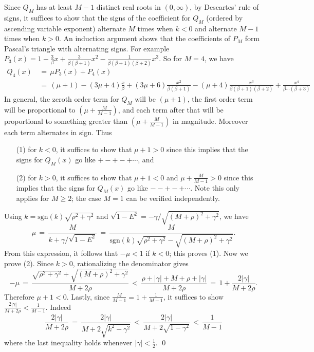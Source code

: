 \documentclass[11 pt]{article}
\renewcommand\({\left(}
\renewcommand\){\right)}
\newcommand\<{\langle}
\renewcommand\>{\rangle}
\newcommand\g{\gamma}
\newcommand\8{\infty}
\newcommand{\half}{\frac{1}{2}}
\newcommand{\sgn}{\mbox{sgn}}
\begin{document}
Since $Q_M$ has at least $M - 1$ distinct real roots in $(0, \infty)$, by Descartes' rule of signs, it suffices to show that the signs of the coefficient for $Q_M$ (ordered by ascending variable exponent) alternate $M$ times when $k < 0$ and alternate $M - 1$ times when $k > 0$. An induction argument shows that the coefficients of $P_M$ form Pascal's triangle with alternating signs. For example $P_3(x) = 1 - \frac{3}{\beta} x + \frac{3}{\beta(\beta + 1)}x^2 - \frac{1}{\beta(\beta + 1)(\beta + 2)}x^3$. So for $M = 4$, we have
\begin{align*}
Q_4(x) \,&=\, \mu P_3(x) + P_4(x)
\\
&=\,  (\mu + 1) -(3\mu + 4) \frac{x}{\beta} + (3\mu + 6)\frac{x^2}{\beta(\beta + 1)} - (\mu + 4)\frac{x^3}{\beta(\beta + 1)(\beta + 2)} + \frac{x^4}{\beta \dotsb (\beta + 3)}
\end{align*} 
In general, the zeroth order term for $Q_M$ will be $(\mu + 1)$, the first order term will be proportional to $(\mu + \frac{M}{M-1})$, and each term after that will be proportional to something greater than $(\mu + \frac{M}{M-1})$ in magnitude. Moreover each term alternates in sign. Thus
\begin{itemize}
\item[(1)]for $k < 0$, it suffices to show that $\mu + 1 > 0$ since this implies that the signs for $Q_M(x)$ go like $+-+-+ \dotsb$, and
\item[(2)] for $k > 0$, it suffices to show that $\mu + 1 < 0$ and $\mu + \frac{M}{M-1} > 0$ since this implies that the signs for $Q_M(x)$ go like $--+-+\dotsb$. Note this only applies for $M \geq 2$; the case $M = 1$ can be verified independently.
\end{itemize}
Using $k = \sgn(k) \sqrt{\rho^2 + \g^2}$ and $\sqrt{1 - E^2} = -\g/\sqrt{(M + \rho)^2 + \g^2}$, we have
\[
\mu \,=\, \frac{M}{k + \g/\sqrt{1 - E^2}} \,=\, \frac{M}{\sgn(k) \sqrt{\rho^2 + \g^2} - \sqrt{(M + \rho)^2 + \g^2}}.
\]
From this expression, it follows that $-\mu < 1$ if $k < 0$;  this proves (1). Now we prove (2). Since $k > 0$, rationalizing the denominator gives
\[
-\mu \,=\, \frac{\sqrt{\rho^2 + \g^2} + \sqrt{(M + \rho)^2 + \g^2}}{M + 2\rho} \,<\, \frac{\rho + |\g| + M + \rho + |\g|}{M + 2\rho} \,=\, 1 + \frac{2|\gamma|}{M + 2\rho}. 
\]
Therefore $\mu + 1 < 0$. Lastly, since $\frac{M}{M-1} = 1 + \frac{1}{M-1}$, it suffices to show $\frac{2|\gamma|}{M + 2\rho} < \frac{1}{M -1}$. Indeed
\[
\frac{2|\gamma|}{M + 2\rho} \,=\, \frac{2|\gamma|}{M + 2\sqrt{k^2 - \g^2}} \,<\, \frac{2|\gamma|}{M + 2\sqrt{1-\gamma^2}} \,<\, \frac{1}{M-1}  
\]
where the last inequality holds whenever $|\g| < \half$. \qed
\end{document}

